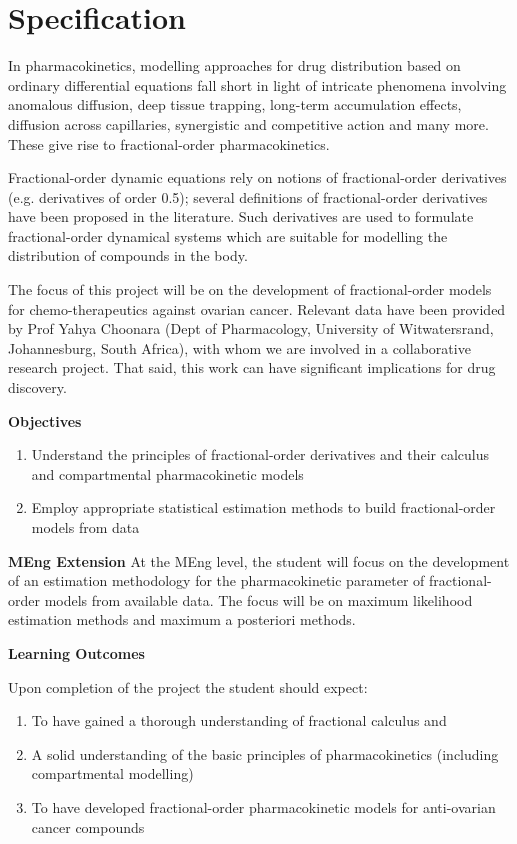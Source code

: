 \section{Specification}
In pharmacokinetics, modelling approaches for drug distribution based on ordinary differential equations fall short in light of intricate phenomena involving anomalous diffusion, deep tissue trapping, long-term accumulation effects, diffusion across capillaries, synergistic and competitive action and many more. These give rise to fractional-order pharmacokinetics.

Fractional-order dynamic equations rely on notions of fractional-order derivatives (e.g. derivatives of order 0.5); several definitions of fractional-order derivatives have been proposed in the literature. Such derivatives are used to formulate fractional-order dynamical systems which are suitable for modelling the distribution of compounds in the body.

The focus of this project will be on the development of fractional-order models for chemo-therapeutics against ovarian cancer. Relevant data have been provided by Prof Yahya Choonara (Dept of Pharmacology, University of Witwatersrand, Johannesburg, South Africa), with whom we are involved in a collaborative research project. That said, this work can have significant implications for drug discovery.\newline

\textbf{Objectives}
\begin{enumerate}
  \item Understand the principles of fractional-order derivatives and their calculus and compartmental pharmacokinetic models
  \item Employ appropriate statistical estimation methods to build fractional-order models from data
\end{enumerate}

\textbf{MEng Extension}\newline \newline
At the MEng level, the student will focus on the development of an estimation methodology for the pharmacokinetic parameter of fractional-order models from available data. The focus will be on maximum likelihood estimation methods and maximum a posteriori methods.\newline

\newpage
\textbf{Learning Outcomes}\newline

Upon completion of the project the student should expect:

\begin{enumerate}
  \item To have gained a thorough understanding of fractional calculus and
  \item A solid understanding of the basic principles of pharmacokinetics (including compartmental modelling)
  \item To have developed fractional-order pharmacokinetic models for anti-ovarian cancer compounds
\end{enumerate}
